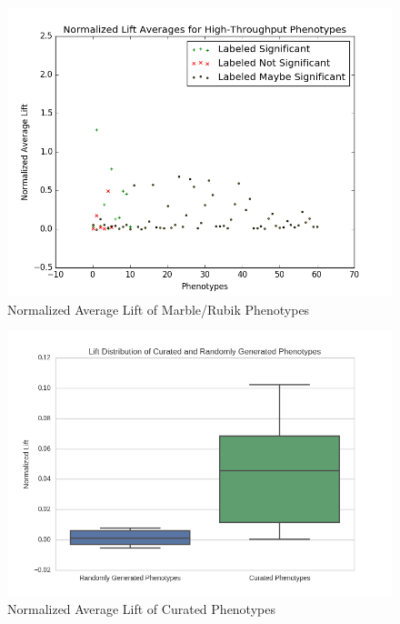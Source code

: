 \documentclass{sig-alternate-05-2015}
\begin{document}
\begin{figure} [t]
\centering
\includegraphics[width=\linewidth]{normalizedLiftAvg_without0s.png}
\caption{Normalized Average Lift of Marble/Rubik Phenotypes}
\label{fig:kho-josh-all}
\end{figure}


\begin{figure} [t]
\centering
\includegraphics[width=\linewidth] {normalizedLiftAvg_boxplot.png}
\caption{Normalized Average Lift of Curated Phenotypes}
\label{fig:curatedPhenos}
\end{figure}


\end{document}
